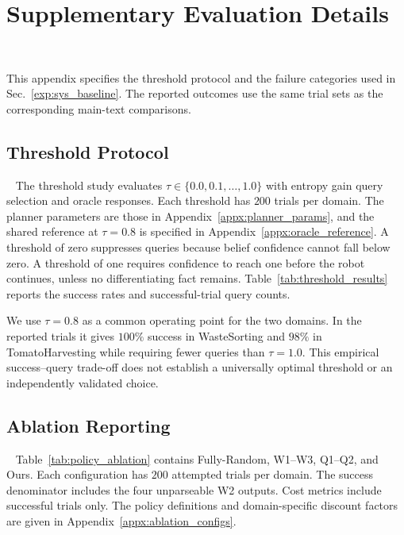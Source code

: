 \section{Supplementary Evaluation Details}~\label{appx:exp}

This appendix specifies the threshold protocol and the failure categories used in Sec.~\ref{exp:sys_baseline}. The reported outcomes use the same trial sets as the corresponding main-text comparisons.

\subsection{Threshold Protocol}~\label{appx:threshold_exp}
The threshold study evaluates $\tau\in\{0.0,0.1,\ldots,1.0\}$ with entropy gain query selection and oracle responses. Each threshold has $200$ trials per domain. The planner parameters are those in Appendix~\ref{appx:planner_params}, and the shared reference at $\tau=0.8$ is specified in Appendix~\ref{appx:oracle_reference}. A threshold of zero suppresses queries because belief confidence cannot fall below zero. A threshold of one requires confidence to reach one before the robot continues, unless no differentiating fact remains. Table~\ref{tab:threshold_results} reports the success rates and successful-trial query counts.

We use $\tau=0.8$ as a common operating point for the two domains. In the reported trials it gives $100\%$ success in WasteSorting and $98\%$ in TomatoHarvesting while requiring fewer queries than $\tau=1.0$. This empirical success--query trade-off does not establish a universally optimal threshold or an independently validated choice.

\subsection{Ablation Reporting}~\label{appx:policy_comparison}
Table~\ref{tab:policy_ablation} contains Fully-Random, W1--W3, Q1--Q2, and Ours. Each configuration has $200$ attempted trials per domain. The success denominator includes the four unparseable W2 outputs. Cost metrics include successful trials only. The policy definitions and domain-specific discount factors are given in Appendix~\ref{appx:ablation_configs}.

